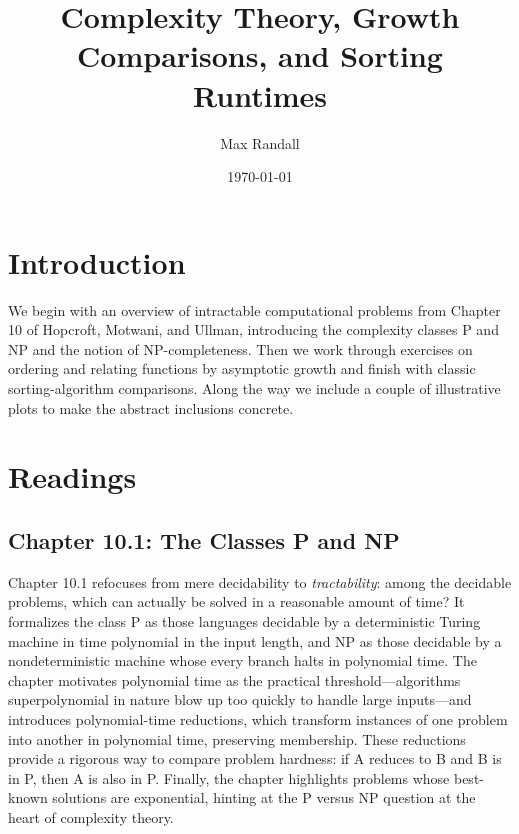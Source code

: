 \documentclass[12pt]{article}
\title{Complexity Theory, Growth Comparisons, and Sorting Runtimes}
\author{Max Randall}
\date{\today}
\begin{document}
\maketitle
\tableofcontents

\section{Introduction}
We begin with an overview of intractable computational problems from Chapter 10 of Hopcroft, Motwani, and Ullman, introducing the complexity classes P and NP and the notion of NP-completeness. Then we work through exercises on ordering and relating functions by asymptotic growth and finish with classic sorting-algorithm comparisons. Along the way we include a couple of illustrative plots to make the abstract inclusions concrete.

\newpage

\section{Readings}

\subsection{Chapter 10.1: The Classes P and NP}
Chapter 10.1 refocuses from mere decidability to \emph{tractability}: among the decidable problems, which can actually be solved in a reasonable amount of time?  It formalizes the class P as those languages decidable by a deterministic Turing machine in time polynomial in the input length, and NP as those decidable by a nondeterministic machine whose every branch halts in polynomial time.  The chapter motivates polynomial time as the practical threshold—algorithms superpolynomial in nature blow up too quickly to handle large inputs—and introduces polynomial-time reductions, which transform instances of one problem into another in polynomial time, preserving membership.  These reductions provide a rigorous way to compare problem hardness: if A reduces to B and B is in P, then A is also in P.  Finally, the chapter highlights problems whose best-known solutions are exponential, hinting at the P versus NP question at the heart of complexity theory.
\end{document}
